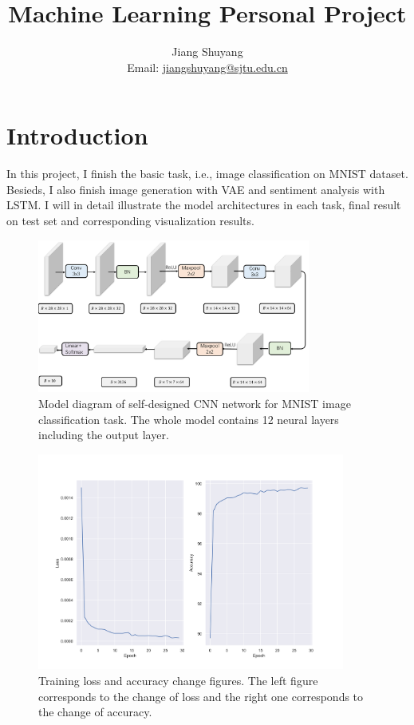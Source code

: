 \documentclass{article}
\title{Machine Learning Personal Project}
\author{Jiang Shuyang \\ Email: \href{mailto:jiangshuyang@sjtu.edu.cn}{jiangshuyang@sjtu.edu.cn}}
\begin{document}
\maketitle

\section{Introduction}
In this project, I finish the basic task, i.e., image classification on MNIST dataset. Besieds, I also finish image generation with VAE and sentiment analysis with LSTM. I will in detail illustrate the model architectures in each task, final result on test set and corresponding visualization results.

\begin{figure}[htbp]
    \centering
    \includegraphics[width=0.8\textwidth]{cnn.pdf}
    \caption{Model diagram of self-designed CNN network for MNIST image classification task. The whole model contains 12 neural layers including the output layer.}
    \label{fig:CNN_arch}
\end{figure}

\begin{figure}[htbp]
    \centering
    \includegraphics[width=0.9\textwidth]{../images/mnist-train-loss-acc.png}
    \caption{Training loss and accuracy change figures. The left figure corresponds to the change of loss and the right one corresponds to the change of accuracy.}
    \label{fig:cnn_loss_acc}
\end{figure}
\end{document}
